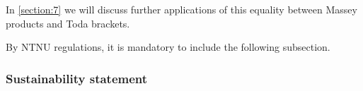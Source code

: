 In \autoref{section:7} we will discuss further applications of this equality between Massey products and Toda brackets.

By NTNU regulations, it is mandatory to include the following subsection.
\subsubsection{Sustainability statement}

